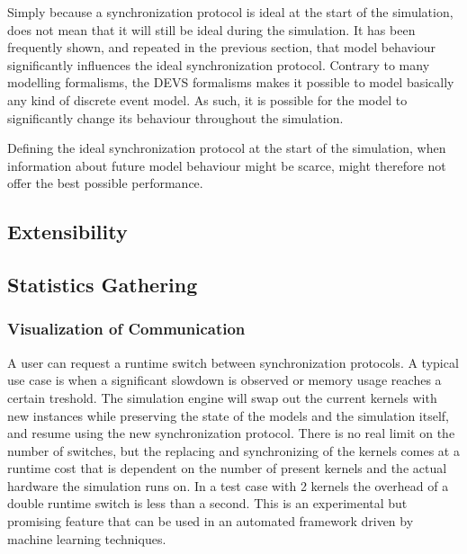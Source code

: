 Simply because a synchronization protocol is ideal at the start of the simulation, does not mean that it will still be ideal during the simulation.
It has been frequently shown, and repeated in the previous section, that model behaviour significantly influences the ideal synchronization protocol.
Contrary to many modelling formalisms, the DEVS formalisms makes it possible to model basically any kind of discrete event model.
As such, it is possible for the model to significantly change its behaviour throughout the simulation.

Defining the ideal synchronization protocol at the start of the simulation, when information about future model behaviour might be scarce, might therefore not offer the best possible performance.

\subsection{Extensibility}

\subsection{Statistics Gathering}

\subsubsection{Visualization of Communication}

A user can request a runtime switch between synchronization protocols. A typical use case is when a significant slowdown is observed or memory usage reaches a certain treshold. The simulation engine will swap out the current kernels with new instances while preserving the state of the models and the simulation itself, and resume using the new synchronization protocol. There is no real limit on the number of switches, but the replacing and synchronizing of the kernels comes at a runtime cost that is dependent on the number of present kernels and the actual hardware the simulation runs on. In a test case with 2 kernels the overhead of a double runtime switch is less than a second.
This is an experimental but promising feature that can be used in an automated framework driven by machine learning techniques.

